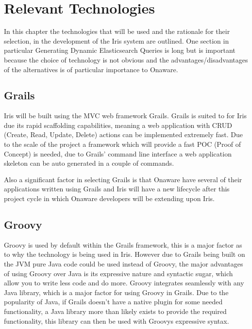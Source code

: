 \documentclass[12pt,a4paper,titlepage]{report}
\begin{document}
\chapter{Relevant Technologies}

In this chapter the technologies that will be used and the rationale for their selection, in the development of the Iris system are outlined. One section in particular Generating Dynamic Elasticsearch Queries is long but is important because the choice of technology is not obvious and the advantages/disadvantages of the alternatives is of particular importance to Onaware.

\section{Grails}

Iris will be built using the MVC web framework Grails. Grails is suited to for Iris due its rapid scaffolding capabilities, meaning a web application with CRUD (Create, Read, Update, Delete) actions can be implemented extremely fast. Due to the scale of the project a framework which will provide a fast POC (Proof of Concept) is needed, due to Grails’ command line interface a web application skeleton can be auto generated in a couple of commands. 

Also a significant factor in selecting Grails is that Onaware have several of their applications written using Grails and Iris will have a new lifecycle after this project cycle in which Onaware developers will be extending upon Iris. 

\section{Groovy}

Groovy is used by default within the Grails framework, this is a major factor as to why the technology is being used in Iris. However due to Grails being built on the JVM pure Java code could be used instead of Groovy, the major advantages of using Groovy over Java is its expressive nature and syntactic sugar, which allow you to write less code and do more. Groovy integrates seamlessly with any Java library, which is a major factor for using Groovy in Grails. Due to the popularity of Java, if Grails doesn’t have a native plugin for some needed functionality, a Java library more than likely exists to provide the required functionality, this library can then be used with Groovys expressive syntax.
\end{document}
